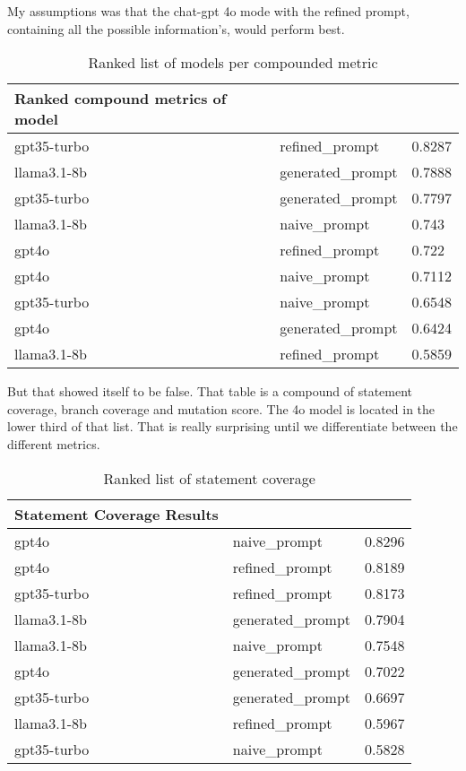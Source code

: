 \documentclass[a4paper,11pt,oneside]{memoir}
\begin{document}
My assumptions was that the chat-gpt 4o mode with the refined prompt, containing all the possible information's, would perform best.

\begin{table}[!ht]
    \centering
    \begin{tabular}{|l|l|l|}
    \hline
        Ranked compound metrics of model & ~ & ~ \\ \hline
        gpt35-turbo &  refined\_prompt & 0.8287 \\ \hline
        llama3.1-8b &  generated\_prompt & 0.7888 \\ \hline
        gpt35-turbo &  generated\_prompt & 0.7797 \\ \hline
        llama3.1-8b &  naive\_prompt & 0.743 \\ \hline
        gpt4o &  refined\_prompt & 0.722 \\ \hline
        gpt4o &  naive\_prompt & 0.7112 \\ \hline
        gpt35-turbo &  naive\_prompt & 0.6548 \\ \hline
        gpt4o &  generated\_prompt & 0.6424 \\ \hline
        llama3.1-8b &  refined\_prompt & 0.5859 \\ \hline
    \end{tabular}
    \caption{Ranked list of models per compounded metric}
\end{table}

But that showed itself to be false. That table is a compound of statement coverage, branch coverage and mutation score. The 4o model is located in the lower third of that list. That is really surprising until we differentiate between the different metrics.

\begin{table}[!ht]
    \centering
    \begin{tabular}{|l|l|l|}
    \hline
        Statement Coverage Results & ~ & ~ \\ \hline
        gpt4o &  naive\_prompt & 0.8296 \\ \hline
        gpt4o &  refined\_prompt & 0.8189 \\ \hline
        gpt35-turbo &  refined\_prompt & 0.8173 \\ \hline
        llama3.1-8b &  generated\_prompt & 0.7904 \\ \hline
        llama3.1-8b &  naive\_prompt & 0.7548 \\ \hline
        gpt4o &  generated\_prompt & 0.7022 \\ \hline
        gpt35-turbo &  generated\_prompt & 0.6697 \\ \hline
        llama3.1-8b &  refined\_prompt & 0.5967 \\ \hline
        gpt35-turbo &  naive\_prompt & 0.5828 \\ \hline
    \end{tabular}
    \caption{Ranked list of statement coverage}
\end{table}
\end{document}
